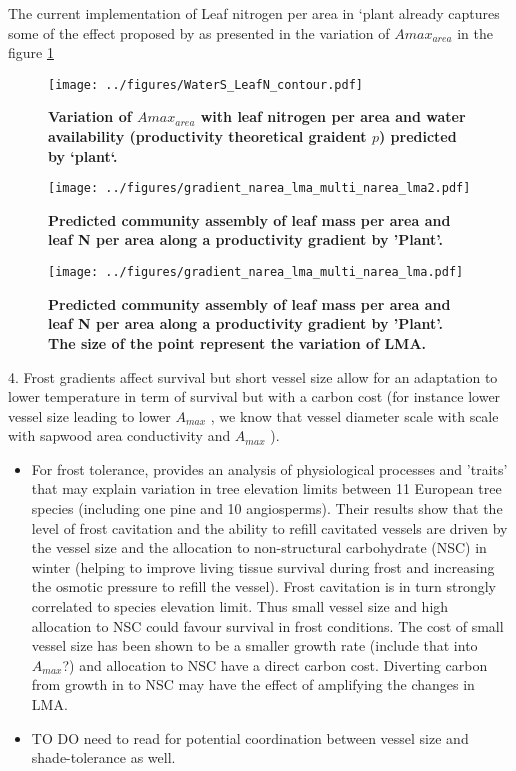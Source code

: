 \documentclass[a4paper,11pt]{article}
\begin{document}
The current implementation of Leaf nitrogen per area in `plant already captures some of the effect proposed by \citet{Wright-2003} as presented in the variation of $A{max}_{area}$ in the figure \ref{fig:leafN_water}

\begin{figure}[ht]
\centering
\texttt{[image: ../figures/WaterS\_LeafN\_contour.pdf]}
\caption{\textbf{Variation of $A{max}_{area}$ with leaf nitrogen per area and water availability (productivity theoretical graident $p$) predicted by `plant`.}
\label{fig:leafN_water}}
\end{figure}


\begin{figure}[ht]
\centering
\texttt{[image: ../figures/gradient\_narea\_lma\_multi\_narea\_lma2.pdf]}
\caption{\textbf{Predicted community assembly of leaf mass per area and leaf N per area along a productivity gradient by 'Plant'.}
\label{fig:lma_mat_o_map}}
\end{figure}

\begin{figure}[ht]
\centering
\texttt{[image: ../figures/gradient\_narea\_lma\_multi\_narea\_lma.pdf]}
\caption{\textbf{Predicted community assembly of leaf mass per area and leaf N per area along a productivity gradient by 'Plant'. The size of the point represent the variation of LMA.}
\label{fig:lma_mat_o_map}}
\end{figure}
 
\clearpage

4. Frost gradients affect survival but
short vessel size allow for an adaptation to lower temperature in term
of survival but
with a carbon cost (for instance lower vessel size leading to lower
$A_{max}$ \citep{Poorter-2010}, we know that vessel diameter scale with scale with sapwood area conductivity and $A_{max}$ \citep{Chen-2009,Choat-2011}).


\begin{itemize}
\item  For frost tolerance, \citet{Charrier-2013} provides an analysis of physiological processes and 'traits' that may explain variation in tree elevation limits between 11 European tree species (including one pine and 10 angiosperms). Their results show that the level of frost cavitation and the ability to refill cavitated vessels are driven by the vessel size and the allocation to non-structural carbohydrate (NSC) in winter (helping to improve living tissue survival during frost and increasing the osmotic pressure to refill the vessel). Frost cavitation is in turn strongly correlated to species elevation limit. Thus small vessel size and high allocation to NSC could favour survival in frost conditions. The cost of small vessel size has been shown to be a smaller growth rate \citep{Poorter-2010} (include that into $A_{max}$?) and allocation to NSC have a direct carbon cost. Diverting carbon from growth in to NSC may have the effect of amplifying the changes in LMA.
\item TO DO need to read \citet{Markesteijn-2011} for potential coordination between vessel size and shade-tolerance as well.
\end{itemize}
\end{document}
